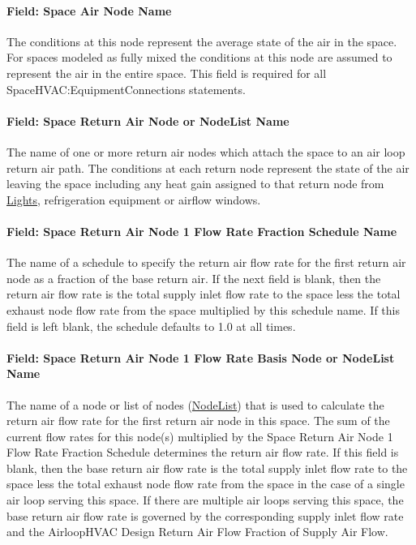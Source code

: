 \paragraph{Field: Space Air Node Name}\label{field-space-air-node-name}

The conditions at this node represent the average state of the air in the space. For spaces modeled as fully mixed the conditions at this node are assumed to represent the air in the entire space. This field is required for all SpaceHVAC:EquipmentConnections statements.

\paragraph{Field: Space Return Air Node or NodeList Name}\label{field-space-return-air-node-or-nodelist-name}

The name of one or more return air nodes which attach the space to an air loop return air path. The conditions at each return node represent the state of the air leaving the space including any heat gain assigned to that return node from \hyperref[lights-000]{Lights}, refrigeration equipment or airflow windows.

\paragraph{Field: Space Return Air Node 1 Flow Rate Fraction Schedule Name}\label{field-space-return-air-flow-rate-fraction-schedule-name}

The name of a schedule to specify the return air flow rate for the first return air node as a fraction of the base return air. If the next field is blank, then the return air flow rate is the total supply inlet flow rate to the space less the total exhaust node flow rate from the space multiplied by this schedule name. If this field is left blank, the schedule defaults to 1.0 at all times.

\paragraph{Field: Space Return Air Node 1 Flow Rate Basis Node or NodeList Name}\label{field-space-return-air-flow-rate-basis-node-or-nodelist-name}

The name of a node or list of nodes (\hyperref[nodelist]{NodeList}) that is used to calculate the return air flow rate for the first return air node in this space. The sum of the current flow rates for this node(s) multiplied by the Space Return Air Node 1 Flow Rate Fraction Schedule determines the return air flow rate. If this field is blank, then the base return air flow rate is the total supply inlet flow rate to the space less the total exhaust node flow rate from the space in the case of a single air loop serving this space. If there are multiple air loops serving this space, the base return air flow rate is governed by the corresponding supply inlet flow rate and the AirloopHVAC Design Return Air Flow Fraction of Supply Air Flow.

